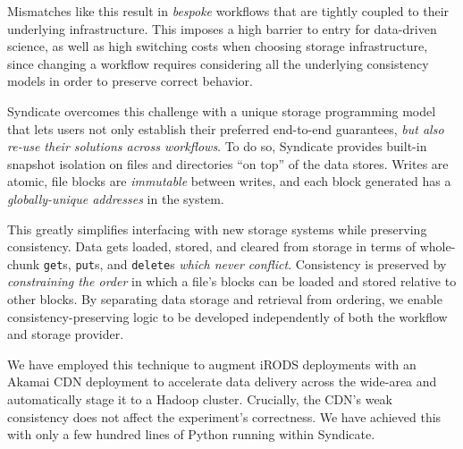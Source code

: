 \documentclass[letterpaper,twocolumn,10pt]{article}
\begin{document}
Mismatches like this result in \emph{bespoke}
workflows that are tightly coupled to their underlying infrastructure.  This
imposes a high barrier to entry for data-driven science, as well as high
switching costs when choosing storage infrastructure, since changing a workflow
requires considering all the underlying consistency models in
order to preserve correct behavior.

Syndicate overcomes this challenge with a unique storage programming model that
lets users not only establish their preferred end-to-end guarantees,
\emph{but also re-use their solutions across workflows}.  To do so, Syndicate
provides built-in snapshot isolation on files and directories ``on top'' of the
data stores.  Writes are atomic, file blocks are \emph{immutable}
between writes, and each block generated has a \emph{globally-unique addresses} in the system.

This greatly simplifies interfacing with new storage systems while preserving
consistency.  Data gets loaded, stored, and cleared from storage in terms of
whole-chunk \texttt{get}s, \texttt{put}s, and \texttt{delete}s \emph{which never conflict}.
Consistency is preserved by \emph{constraining the order} in which a file's blocks can be
loaded and stored relative to other blocks.  By separating data storage and
retrieval from ordering, we enable consistency-preserving logic to be developed
independently of both the workflow and storage provider.

We have employed this technique to augment iRODS deployments with an Akamai CDN
deployment to accelerate data delivery across the wide-area and automatically
stage it to a Hadoop cluster.  Crucially, the CDN's weak consistency does not
affect the experiment's correctness.  We have achieved this with only a few
hundred lines of Python running within Syndicate.
\end{document}
